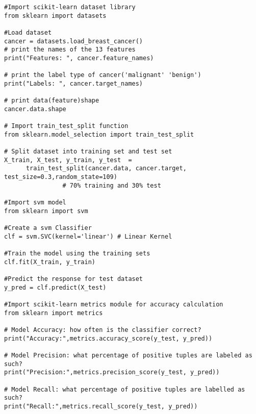 \documentclass[11pt]{article}
\begin{document}
\begin{verbatim}
#Import scikit-learn dataset library
from sklearn import datasets

#Load dataset
cancer = datasets.load_breast_cancer()
# print the names of the 13 features
print("Features: ", cancer.feature_names)

# print the label type of cancer('malignant' 'benign')
print("Labels: ", cancer.target_names)

# print data(feature)shape
cancer.data.shape

# Import train_test_split function
from sklearn.model_selection import train_test_split

# Split dataset into training set and test set
X_train, X_test, y_train, y_test  =
	  train_test_split(cancer.data, cancer.target, test_size=0.3,random_state=109) 
				# 70% training and 30% test

#Import svm model
from sklearn import svm

#Create a svm Classifier
clf = svm.SVC(kernel='linear') # Linear Kernel

#Train the model using the training sets
clf.fit(X_train, y_train)

#Predict the response for test dataset
y_pred = clf.predict(X_test)

#Import scikit-learn metrics module for accuracy calculation
from sklearn import metrics

# Model Accuracy: how often is the classifier correct?
print("Accuracy:",metrics.accuracy_score(y_test, y_pred))

# Model Precision: what percentage of positive tuples are labeled as such?
print("Precision:",metrics.precision_score(y_test, y_pred))

# Model Recall: what percentage of positive tuples are labelled as such?
print("Recall:",metrics.recall_score(y_test, y_pred))


\end{verbatim}
\end{document}
